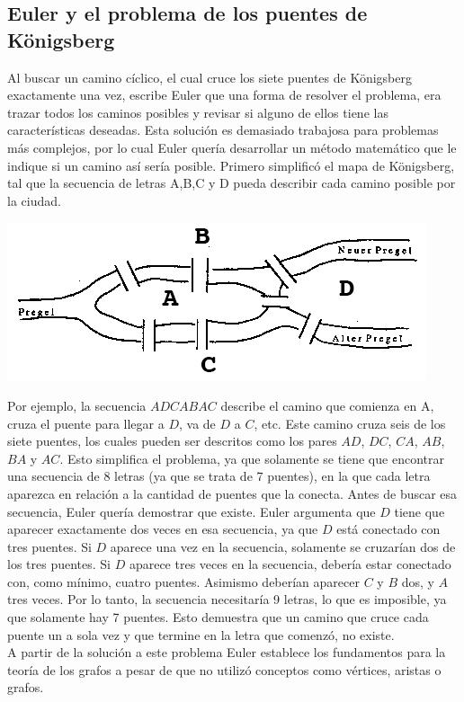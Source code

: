 \documentclass[12pt]{article}
\begin{document}
\subsection{Euler y el problema de los puentes de K\"{o}nigsberg}
Al buscar un camino cíclico, el cual cruce los siete puentes de K\"{o}nigsberg exactamente una vez, escribe Euler que una forma de resolver el problema, era trazar todos los caminos posibles y revisar si alguno de ellos tiene las características deseadas. Esta solución es demasiado trabajosa para problemas más complejos, por lo cual Euler quería desarrollar un método matemático que le indique si un camino así sería posible. Primero simplificó el mapa de K\"{o}nigsberg, tal que la secuencia de letras A,B,C y D pueda describir cada camino posible por la ciudad.
\begin{center}
\includegraphics[scale=0.7]{pregelbruecken.png}
\end{center}
Por ejemplo, la secuencia $ADCABAC$ describe el camino que comienza en A, cruza el puente para llegar a $D$, va de $D$ a $C$, etc. Este camino cruza seis de los siete puentes, los cuales pueden ser descritos como los pares $AD$, $DC$, $CA$, $AB$, $BA$ y $AC$. Esto simplifica el problema, ya que solamente se tiene que encontrar una secuencia de 8 letras (ya que se trata de 7 puentes), en la que cada letra aparezca en relación a la cantidad de puentes que la conecta. Antes de buscar esa secuencia, Euler quería demostrar que existe. Euler argumenta que $D$ tiene que aparecer exactamente dos veces en esa secuencia, ya que $D$ está conectado con tres puentes. Si $D$ aparece una vez en la secuencia, solamente se cruzarían dos de los tres puentes. Si $D$ aparece tres veces en la secuencia, debería estar conectado con, como mínimo, cuatro puentes. Asimismo deberían aparecer $C$ y $B$ dos, y $A$ tres veces. Por lo tanto, la secuencia necesitaría 9 letras, lo que es imposible, ya que solamente hay 7 puentes. Esto demuestra que un camino que cruce cada puente un a sola vez y que termine en la letra que comenzó, no existe. 
\\A partir de la solución a este problema Euler establece los fundamentos para la teoría de los grafos a pesar de que no utilizó conceptos como vértices, aristas o grafos.
\end{document}
